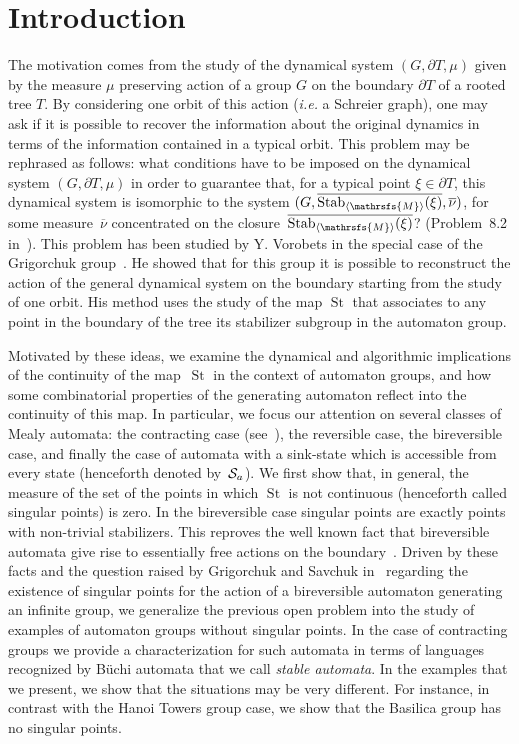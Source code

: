 \documentclass{amsart}
\begin{document}
{\footnotesize
\tableofcontents
}

\section{Introduction}
The motivation comes from the study of the dynamical system $(G, \partial T, {{\mu}})$ given by the measure $\mu$ preserving action of a group $G$ on the boundary $\partial T$ of a rooted tree $T$. By considering one orbit of this action (\emph{i.e.} a Schreier graph), one may ask if it is possible to recover the information about the original dynamics in terms of the information contained in a typical orbit. This problem may be rephrased as follows: what  conditions have to be imposed on the dynamical system $(G,\partial T, {{\mu}})$ in order to guarantee that, for a typical point $\xi\in \partial T$, this dynamical system is isomorphic to the system $(G,\overline{\operatorname{Stab}_{{{\langle}{{\mathrsfs{{{M}}}}}{\rangle}}}(\xi)}, \overline{\nu})$, for some measure~$\overline{\nu}$ concentrated on the closure~$\overline{\operatorname{Stab}_{{{\langle}{{\mathrsfs{{{M}}}}}{\rangle}}}(\xi)}$?  (Problem~8.2 in~\cite{DynSubgroup}). This problem has been studied by Y. Vorobets in the special case of the Grigorchuk group~\cite{vorobets}. He showed that for this group it is possible to reconstruct the action of the general dynamical system on the boundary starting from the study of one orbit. His method uses the study of the map $\operatorname{St}$ that associates to any point in the boundary of the tree its stabilizer subgroup in the automaton group. \medskip

Motivated by these ideas, we examine the dynamical and algorithmic implications of the continuity of the map~$\operatorname{St}$ in the context of automaton groups, and how some combinatorial properties of the generating automaton reflect into the continuity of this map. In particular, we focus our attention on several classes of Mealy automata: the contracting case (see~\cite{Nekra05}), the reversible case, the bireversible case, and finally the case of automata with a sink-state which is accessible from every state (henceforth denoted by~${\hbox{${\mathcal S}_{a}$}}$). We first show that, in general, the measure of the set of the points in which $\operatorname{St}$ is not continuous (henceforth called singular points) is zero. In the bireversible case singular points are exactly points with non-trivial stabilizers. This reproves the well known fact that bireversible automata give rise to essentially free actions on the boundary~\cite[Corollary 2.10]{StVoVo2011}. Driven by these facts and the question raised by Grigorchuk and Savchuk in~\cite{GriSa13} regarding the existence of singular points for the action of a bireversible automaton generating an infinite group, we generalize the previous open problem into the study of examples of automaton groups without singular points. In the case of contracting groups we provide a characterization for such automata in terms of languages recognized by B\"uchi automata that we call \emph{stable automata}. In the examples that we present, we show that the situations may be very different. For instance, in contrast with the Hanoi Towers group case, we show that the Basilica group has no singular points. 
\medskip
\end{document}
